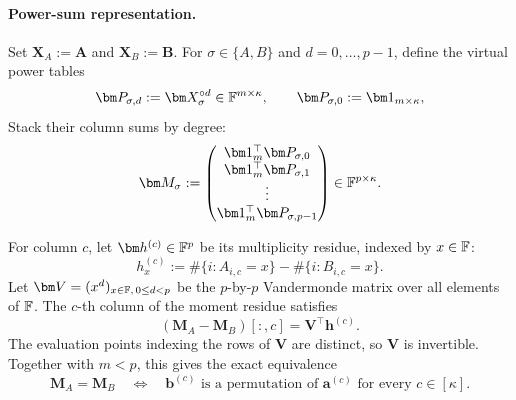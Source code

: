 \documentclass[runningheads]{llncs}
\begin{document}
\paragraph{Power-sum representation.}
Set \(\bm X_A:=\bm A\) and \(\bm X_B:=\bm B\).  For
\(\sigma\in\{A,B\}\) and \(d=0,\ldots,p-1\), define the virtual power
tables
\begin{equation}
    \bm P_{\sigma,d}:=\bm X_\sigma^{\circ d}
      \in\Field^{m\times\kappa},
    \qquad
    \bm P_{\sigma,0}:=\bm 1_{m\times\kappa},
\label{eq:packed-permutation-power-tables}
\end{equation}
Stack their column sums by degree:
\begin{equation}
    \bm M_\sigma
      :=
      \begin{pmatrix}
        \bm 1_m^\top\bm P_{\sigma,0}\\
        \bm 1_m^\top\bm P_{\sigma,1}\\
        \vdots\\
        \bm 1_m^\top\bm P_{\sigma,p-1}
      \end{pmatrix}
      \in\Field^{p\times\kappa}.
\label{eq:packed-permutation-moment-matrix}
\end{equation}

For column \(c\), let \(\bm h^{(c)}\in\Field^p\) be its multiplicity
residue, indexed by \(x\in{\mathbb{F}}\):
\[
    h_x^{(c)}
      :=
      \#\{i:A_{i,c}=x\}
      -\#\{i:B_{i,c}=x\}.
\]
Let \(\bm V=(x^d)_{x\in\Field,\,0\leq d<p}\) be the \(p\)-by-\(p\)
Vandermonde matrix over all elements of \({\mathbb{F}}\).  The \(c\)-th
column of the moment residue satisfies
\begin{equation}
    (\bm M_A-\bm M_B)[:,c]
      =\bm V^\top\bm h^{(c)}.
\label{eq:packed-permutation-vandermonde-link}
\end{equation}
The evaluation points indexing the rows of \(\bm V\) are distinct, so
\(\bm V\) is invertible.  Together with \(m<p\), this gives the exact
equivalence
\begin{equation}
    \boxed{
    \bm M_A=\bm M_B
      \quad\Longleftrightarrow\quad
    \bm b^{(c)}\text{ is a permutation of }\bm a^{(c)}
      \text{ for every }c\in[\kappa].
    }
\label{eq:packed-permutation-moment-equivalence}
\end{equation}
\end{document}
